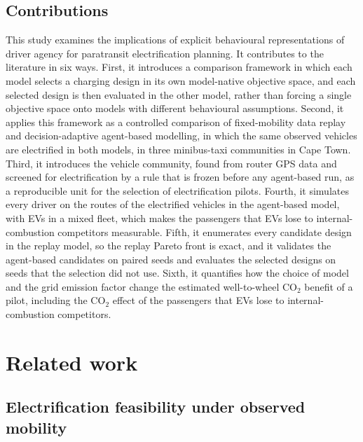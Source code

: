 \documentclass{elsarticle}
\begin{document}
\subsection{Contributions}
This study examines the implications of explicit behavioural representations of driver agency for paratransit electrification planning. It contributes to the literature in six ways. First, it introduces a comparison framework in which each model selects a charging design in its own model-native objective space, and each selected design is then evaluated in the other model, rather than forcing a single objective space onto models with different behavioural assumptions. Second, it applies this framework as a controlled comparison of fixed-mobility data replay and decision-adaptive agent-based modelling, in which the same observed vehicles are electrified in both models, in three minibus-taxi communities in Cape Town. Third, it introduces the vehicle community, found from router GPS data and screened for electrification by a rule that is frozen before any agent-based run, as a reproducible unit for the selection of electrification pilots. Fourth, it simulates every driver on the routes of the electrified vehicles in the agent-based model, with EVs in a mixed fleet, which makes the passengers that EVs lose to internal-combustion competitors measurable. Fifth, it enumerates every candidate design in the replay model, so the replay Pareto front is exact, and it validates the agent-based candidates on paired seeds and evaluates the selected designs on seeds that the selection did not use. Sixth, it quantifies how the choice of model and the grid emission factor change the estimated well-to-wheel CO$_2$ benefit of a pilot, including the CO$_2$ effect of the passengers that EVs lose to internal-combustion competitors.


\section{Related work}
\label{sec:related_work}

\subsection{Electrification feasibility under observed mobility}
\label{sec:rw_replay}
\end{document}
